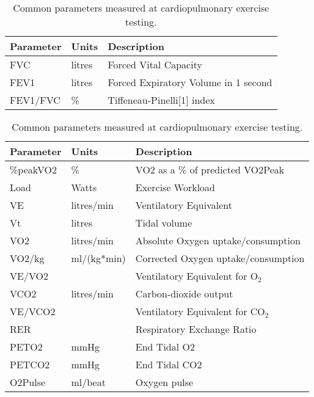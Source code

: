\begin{table}[p]
\centering
\caption{Parameters measured at spirometry.}
\label{table:spirometry}
\begin{tabular}{| m{2cm}  m{2cm}  m{7cm} |}
	\hline
	Parameter & Units  & Description                          \\ \hline
	FVC       & litres & Forced Vital Capacity                \\
	FEV1      & litres & Forced Expiratory Volume in 1 second \\
	FEV1/FVC  & \%     & Tiffeneau-Pinelli[1] index           \\ \hline
\end{tabular}

\vspace{2cm}


\caption{Common parameters measured at cardiopulmonary exercise testing.}
\label{table:cpet_parameters}
\begin{tabular}{| m{2cm}  m{2cm}  m{7cm} |}
	\hline
	Parameter & Units       & Description                                  \\ \hline
	\%peakVO2 & \%          & VO2 as a \% of predicted VO2Peak             \\
	Load      & Watts       & Exercise Workload                            \\
	VE        & litres/min  & Ventilatory Equivalent                       \\
	Vt        & litres      & Tidal volume                                 \\
	VO2       & litres/min  & Absolute Oxygen uptake/consumption           \\
	VO2/kg    & ml/(kg*min) & Corrected Oxygen uptake/consumption          \\
	VE/VO2    &             & Ventilatory Equivalent for O$_2$             \\
	VCO2      & litres/min  & Carbon-dioxide output                        \\
	VE/VCO2   &             & Ventilatory Equivalent for CO$_2$            \\
	RER       &             & Respiratory Exchange Ratio                   \\
	PETO2     & mmHg        & End Tidal O2                                 \\
	PETCO2    & mmHg        & End Tidal CO2                                \\
	O2Pulse   & ml/beat     & Oxygen pulse                                 \\

\end{tabular}
\end{table}
